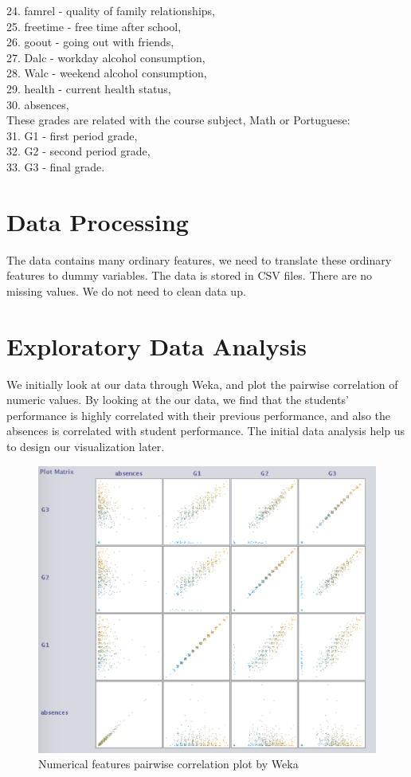 \documentclass{article}
\begin{document}
24. famrel - quality of family relationships, \\
25. freetime - free time after school, \\
26. goout - going out with friends,\\
27. Dalc - workday alcohol consumption,\\ 
28. Walc - weekend alcohol consumption,\\ 
29. health - current health status, \\
30. absences, \\
These grades are related with the course subject, Math or Portuguese: \\
31. G1 - first period grade, \\
32. G2 - second period grade,\\ 
33. G3 - final grade. \\

\section{Data Processing}
The data contains many ordinary features, we need to translate these ordinary features to dummy variables. The data is stored in CSV files. There are no missing values. We do not need to clean data up.

\section{Exploratory Data Analysis}
We initially look at our data through Weka, and plot the pairwise correlation of numeric values. By looking at the our data, we find that the students' performance is highly correlated with their previous performance, and also the absences is correlated with student performance. The initial data analysis help us to design our visualization later.

\begin{figure}[H]
\centering
\includegraphics[scale=0.7]{inital.png}
\caption{Numerical features pairwise correlation plot by Weka}
\end{figure}
\end{document}
